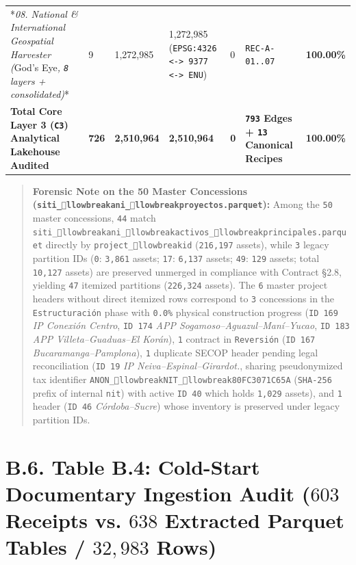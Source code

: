 \documentclass[10pt,a4paper]{article}
\begin{document}
{\begin{longtable}{p{}p{}p{}p{}p{}p{}p{}}
*\textit{08. National \& International Geospatial Harvester (}God's Eye\textit{, \texttt{8} layers + consolidated)}* & 9 & 1,272,985 & 1,272,985 (\texttt{EPSG:4326 <-> 9377 <-> ENU}) & 0 & \texttt{REC-A-01..07} & \textbf{100.00\%} \\
\textbf{Total Core Layer 3 (\texttt{C3}) Analytical Lakehouse Audited} & \textbf{726} & \textbf{2,510,964} & \textbf{2,510,964} & \textbf{0} & \textbf{\texttt{793} Edges + \texttt{13} Canonical Recipes} & \textbf{100.00\%} \\
\bottomrule
\end{longtable}
}

\begin{quote}\small \textbf{Forensic Note on the 50 Master Concessions (\texttt{siti\_llowbreak{}ani\_llowbreak{}proyectos.parquet}):} Among the \texttt{50} master concessions, \texttt{44} match \texttt{siti\_llowbreak{}ani\_llowbreak{}activos\_llowbreak{}principales.parquet} directly by \texttt{project\_llowbreak{}id} (\texttt{216,197} assets), while \texttt{3} legacy partition IDs (\texttt{0}: \texttt{3,861} assets; \texttt{17}: \texttt{6,137} assets; \texttt{49}: \texttt{129} assets; total \texttt{10,127} assets) are preserved unmerged in compliance with Contract §2.8, yielding \texttt{47} itemized partitions (\texttt{226,324} assets). The \texttt{6} master project headers without direct itemized rows correspond to \texttt{3} concessions in the \texttt{Estructuración} phase with \texttt{0.0\%} physical construction progress (\texttt{ID 169} \textit{IP Conexión Centro}, \texttt{ID 174} \textit{APP Sogamoso--Aguazul--Maní--Yucao}, \texttt{ID 183} \textit{APP Villeta--Guaduas--El Korán}), \texttt{1} contract in \texttt{Reversión} (\texttt{ID 167} \textit{Bucaramanga--Pamplona}), \texttt{1} duplicate SECOP header pending legal reconciliation (\texttt{ID 19} \textit{IP Neiva--Espinal--Girardot.}, sharing pseudonymized tax identifier \texttt{ANON\_llowbreak{}NIT\_llowbreak{}80FC3071C65A} (\texttt{SHA-256} prefix of internal \texttt{nit}) with active \texttt{ID 40} which holds \texttt{1,029} assets), and \texttt{1} header (\texttt{ID 46} \textit{Córdoba--Sucre}) whose inventory is preserved under legacy partition IDs.\end{quote}



\section*{B.6. Table B.4: Cold-Start Documentary Ingestion Audit ($603$ Receipts vs. $638$ Extracted Parquet Tables / $32,983$ Rows)}
\end{document}
